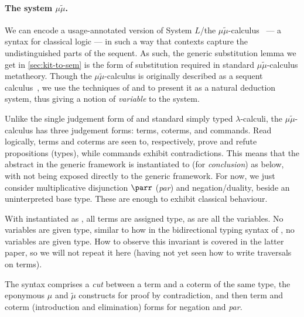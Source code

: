 \paragraph{The system $\mu\tilde\mu$.}
We can encode a usage-annotated version of System $L$/the
$\mu\tilde\mu$-calculus~\cite{CH00} --- a syntax for classical logic --- in
such a way that contexts capture the undistinguished parts of the sequent.
As such, the generic substitution lemma we get in \cref{sec:kit-to-sem} is the
form of substitution required in standard $\mu\tilde\mu$-calculus metatheory.
Though the $\mu\tilde\mu$-calculus is originally described as a sequent
calculus~\cite{CH00}, we use the techniques of
\citet[p.~12]{herbelin-hab} and \citet{LC06} to present it as a natural
deduction system, thus giving a notion of \emph{variable} to the system.

Unlike the single judgement form of \name{} and standard simply typed
$\lambda$-calculi, the $\mu\tilde\mu$-calculus has three judgement forms:
terms, coterms, and commands.
Read logically, terms and coterms are seen to, respectively, prove and refute
propositions (types), while commands exhibit contradictions.
This means that the abstract  in the generic framework is
instantiated to  (for \emph{conclusion}) as below, with
 not being exposed directly to the generic framework.
For now, we just consider multiplicative disjunction $\parr$ (\emph{par}) and
negation/duality, beside an uninterpreted base type.
These are enough to exhibit classical behaviour.

\noindent
\begin{minipage}[t]{0.5\textwidth}
\end{minipage}
\begin{minipage}[t]{0.5\textwidth}
\end{minipage}

With  instantiated as , all terms are assigned
 type, as are all the variables.
No variables are given  type, similar to how in
the bidirectional typing syntax of \citet[p.~25]{AACMM21}, no variables are
given  type.
How to observe this invariant is covered in the latter paper, so we will not
repeat it here (having not yet seen how to write traversals on terms).

The syntax comprises a \emph{cut} between a term and a coterm of the same type,
the eponymous $\mu$ and $\tilde\mu$ constructs for proof by contradiction, and
then term and coterm (introduction and elimination) forms for negation and
\emph{par}.

